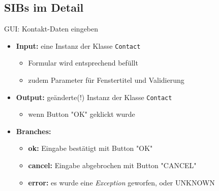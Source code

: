 \subsection*{SIBs im Detail}
\begin{frame}{GUI: Kontakt-Daten eingeben}
\begin{itemize}[<+->]
	\item \textbf{Input:} eine Instanz der Klasse \texttt{Contact} 
		\begin{itemize}[<+->]
			\item Formular wird entsprechend befüllt
			\item zudem Parameter für Fenstertitel und Validierung
		\end{itemize}
	\pause
	\item \textbf{Output:} geänderte(!) Instanz der Klasse \texttt{Contact}
		\begin{itemize}[<+->]
			\item wenn Button "OK" geklickt wurde
		\end{itemize}
	\pause	
	\item \textbf{Branches:} 
		\begin{itemize}[<+->]
			\item \textbf{ok:} Eingabe bestätigt mit Button "OK"
			\item \textbf{cancel:} Eingabe abgebrochen mit Button "CANCEL"
			\item \textbf{error:} es wurde eine \textit{Exception} geworfen, oder UNKNOWN
		\end{itemize}
	
\end{itemize}
\end{frame}


